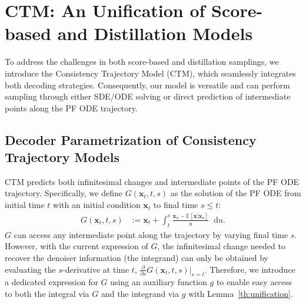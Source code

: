\documentclass{article} \usepackage{iclr2024_coNFErence,times}
\theoremstyle{definition}
\theoremstyle{remark}
\newcommand*\diff{\mathop{}\!\mathrm{d}}
\begin{document}
\section{CTM: An Unification of Score-based and Distillation Models}
To address the challenges in both score-based and distillation samplings, we introduce the Consistency Trajectory Model (CTM), which seamlessly integrates both decoding strategies. Consequently, our model is versatile and can perform sampling through either SDE/ODE solving or direct prediction of intermediate points along the PF ODE trajectory.


\subsection{Decoder Parametrization of Consistency Trajectory Models}\label{sec:motivation}

CTM predicts both infinitesimal changes and intermediate points of the PF ODE trajectory. Specifically, we define $G(\mathbf{x}_{t},t,s)$ as the solution of the PF ODE from initial time $t$ with an initial condition $\mathbf{x}_t$ to final time $s\le t$:
\begin{align}\label{eq:oracle_sol}
    G(\mathbf{x}_{t},t,s)&:=\mathbf{x}_{t}+\int_{t}^{s}\frac{\mathbf{x}_{u}-\mathbb{E}[\mathbf{x}\vert\mathbf{x}_{u}]}{u}\diff u.
\end{align}
$G$ can access any intermediate point along the trajectory by varying final time $s$. However, with the current expression of $G$, the infinitesimal change needed to recover the denoiser information (the integrand) can only be obtained by evaluating the $s$-derivative at time $t$, $\frac{\partial}{\partial s}G(\mathbf{x}_{t},t,s)\vert_{s=t}$. Therefore, we introduce a dedicated expression for $G$ using an auxiliary function $g$ to enable easy access to both the integral via $G$ and the integrand via $g$ with Lemma~\ref{th:unification}. 
\end{document}
